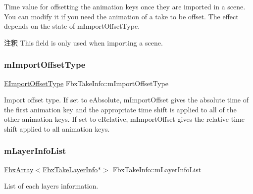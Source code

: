 Time value for offsetting the animation keys once they are imported in a scene. You can modify it if you need the animation of a take to be offset. The effect depends on the state of {\ttfamily m\+Import\+Offset\+Type}. \begin{DoxyRemark}{注釈}
This field is only used when importing a scene. 
\end{DoxyRemark}
\mbox{\label{class_fbx_take_info_a91754fee6b84796e781b532661cfb2bd}} 
\subsubsection{\texorpdfstring{m\+Import\+Offset\+Type}{mImportOffsetType}}
{\footnotesize\ttfamily \hyperlink{class_fbx_take_info_a64a38a536155104dfa7bc79ffb7ef8dc}{E\+Import\+Offset\+Type} Fbx\+Take\+Info\+::m\+Import\+Offset\+Type}

Import offset type. If set to {\ttfamily e\+Absolute}, {\ttfamily m\+Import\+Offset} gives the absolute time of the first animation key and the appropriate time shift is applied to all of the other animation keys. If set to {\ttfamily e\+Relative}, {\ttfamily m\+Import\+Offset} gives the relative time shift applied to all animation keys. \mbox{\label{class_fbx_take_info_a5e71a2f2ecb6d90473d7a2b63c91b175}} 
\subsubsection{\texorpdfstring{m\+Layer\+Info\+List}{mLayerInfoList}}
{\footnotesize\ttfamily \hyperlink{class_fbx_array}{Fbx\+Array}$<$\hyperlink{struct_fbx_take_layer_info}{Fbx\+Take\+Layer\+Info}$\ast$$>$ Fbx\+Take\+Info\+::m\+Layer\+Info\+List}



List of each layer\textquotesingle{}s information. 

\mbox{\label{class_fbx_take_info_a5cbdcdad5fb1b692703784f6d8b6bc51}} 
